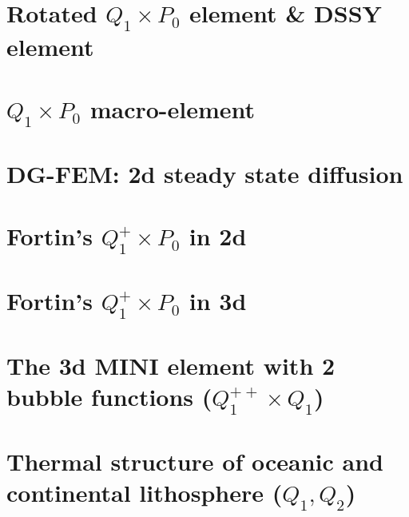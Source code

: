 \documentclass[a4paper,11pt]{report}
\begin{document}
\chapter{Rotated $Q_1\times P_0$ element \& DSSY element \label{f77}} %

\chapter{$Q_1\times P_0$ macro-element \label{f78}} %

\chapter{DG-FEM: 2d steady state diffusion \label{f79}} %

\chapter{Fortin's $Q_1^+\times P_0$ in 2d \label{f80}} %

\chapter{Fortin's $Q_1^+\times P_0$ in 3d \label{f81}} %

\chapter{The 3d MINI element with 2 bubble functions ($Q_1^{++}\times Q_1$) \label{f82}} %

\chapter{Thermal structure of oceanic and continental lithosphere ($Q_1,Q_2$)\label{f83}} %
\end{document}
